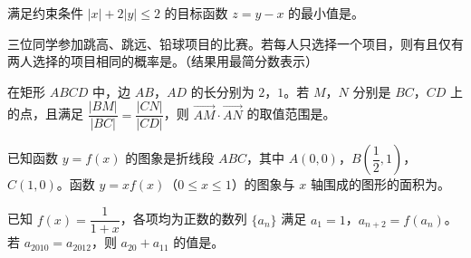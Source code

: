 \begin{question}
满足约束条件 $|x|+2|y|\leqslant2$ 的目标函数 $z=y-x$ 的最小值是\gkblank{}。

\end{question}
\begin{question}
三位同学参加跳高、跳远、铅球项目的比赛。若每人只选择一个项目，则有且仅有两人选择的项目相同的概率是\gkblank{}。（结果用最简分数表示）

\end{question}
\begin{question}
在矩形 $ABCD$ 中，边 $AB$，$AD$ 的长分别为 $2$，$1$。若 $M$，$N$ 分别是 $BC$，$CD$ 上的点，且满足 $\dfrac{|BM|}{|BC|}=\dfrac{|CN|}{|CD|}$，则 $\overrightarrow{AM}\cdot\overrightarrow{AN}$ 的取值范围是\gkblank{}。

\end{question}
\begin{question}
已知函数 $y=f(x)$ 的图象是折线段 $ABC$，其中 $A(0,0)$，$B\left(\dfrac12,1\right)$，$C(1,0)$。函数 $y=xf(x)$（$0\leqslant x\leqslant1$）的图象与 $x$ 轴围成的图形的面积为\gkblank{}。

\end{question}
\begin{question}
已知 $f(x)=\dfrac1{1+x}$，各项均为正数的数列 $\{a_n\}$ 满足 $a_1=1$，$a_{n+2}=f(a_n)$。若 $a_{2010}=a_{2012}$，则 $a_{20}+a_{11}$ 的值是\gkblank{}。

\end{question}

